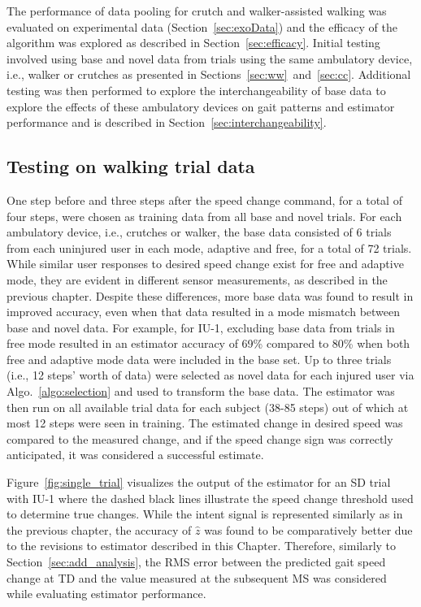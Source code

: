 The performance of data pooling for crutch and walker-assisted walking was evaluated on experimental data (Section~\ref{sec:exoData}) and the efficacy of the algorithm was explored as described in Section~\ref{sec:efficacy}. Initial testing involved using base and novel data from trials using the same ambulatory device, i.e., walker or crutches as presented in Sections~\ref{sec:ww}~and~\ref{sec:cc}. Additional testing was then performed to explore the interchangeability of base data to explore the effects of these ambulatory devices on gait patterns and estimator performance and is described in Section~\ref{sec:interchangeability}.

\subsection{Testing on walking trial data}
One step before and three steps after the speed change command, for a total of four steps, were chosen as training data from all base and novel trials. For each ambulatory device, i.e., crutches or walker, the base data consisted of 6 trials from each uninjured user in each mode, adaptive and free, for a total of 72 trials. While similar user responses to desired speed change exist for free and adaptive mode, they are evident in different sensor measurements, as described in the previous chapter. Despite these differences, more base data was found to result in improved accuracy, even when that data resulted in a mode mismatch between base and novel data. For example, for IU-1, excluding base data from trials in free mode resulted in an estimator accuracy of 69\% compared to 80\% when both free and adaptive mode data were included in the base set. Up to three trials (i.e., 12 steps' worth of data) were selected as novel data for each injured user via Algo.~\ref{algo:selection} and used to transform the base data. The estimator was then run on all available trial data for each subject (38-85 steps) out of which at most 12 steps were seen in training. The estimated change in desired speed was compared to the measured change, and if the speed change sign was correctly anticipated, it was considered a successful estimate.

Figure~\ref{fig:single_trial} visualizes the output of the estimator for an SD trial with IU-1 where the dashed black lines illustrate the speed change threshold used to determine true changes. While the intent signal is represented similarly as in the previous chapter, the accuracy of $ \hat{z} $ was found to be comparatively better due to the revisions to estimator described in this Chapter. Therefore, similarly to Section~\ref{sec:add_analysis}, the RMS error between the predicted gait speed change at TD and the value measured at the subsequent MS was considered while evaluating estimator performance. 

